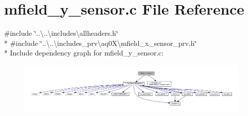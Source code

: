 \hypertarget{a00052}{\section{mfield\+\_\+y\+\_\+sensor.\+c File Reference}
\label{a00052}
}
{\ttfamily \#include \char`\"{}..\textbackslash{}..\textbackslash{}includes\textbackslash{}allheaders.\+h\char`\"{}}\\*
{\ttfamily \#include \char`\"{}..\textbackslash{}..\textbackslash{}includes\+\_\+prv\textbackslash{}aq0\+X\textbackslash{}mfield\+\_\+x\+\_\+sensor\+\_\+prv.\+h\char`\"{}}\\*
Include dependency graph for mfield\+\_\+y\+\_\+sensor.\+c\+:\nopagebreak
\begin{figure}[H]
\begin{center}
\leavevmode
\includegraphics[width=350pt]{d4/d94/a00967}
\end{center}
\end{figure}
